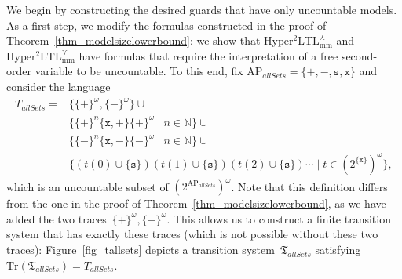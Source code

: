 \documentclass[dvipsnames,10pt,a4paper]{amsart}
\theoremstyle{definition}
\theoremstyle{remark}
\newcommand{\nats}{\mathbb{N}}
\newcommand{\pow}[1]{2^{#1}}
\newcommand{\set}[1]{\{#1\}}
\newcommand{\sohyltlfpmax}{\mathrm{Hyper^2LTL_{\mathrm{mm}}^{\largest}}\xspace}
\newcommand{\sohyltlfpmin}{\mathrm{Hyper^2LTL_{\mathrm{mm}}^{\smallest}}\xspace}
\newcommand{\ap}[0]{\mathrm{AP}}
\newcommand{\smallest}{\curlyvee}
\newcommand{\largest}{\curlywedge}
\newcommand{\tsys}{\mathfrak{T}}
\newcommand{\traces}{\mathrm{Tr}}
\newcommand{\posprop}{\mathtt{+}}
\newcommand{\negprop}{\mathtt{-}}
\newcommand{\setprop}{\mathtt{s}}
\newcommand{\inprop}{\mathtt{x}}
\newcommand{\allsets}{{\mathit{allSets}}}
\begin{document}
We begin by constructing the desired guards that have only uncountable models.
As a first step, we modify the formulas constructed in the proof of Theorem~\ref{thm_modelsizelowerbound}: we show that $\sohyltlfpmax$ and $\sohyltlfpmin$ have formulas that require the interpretation of a free second-order variable to be uncountable.
To this end, fix $\ap_\allsets = \set{\posprop, \negprop, \setprop,\inprop}$ and consider the language
\begin{align*}
T_\allsets ={}&{} \set{ \set{\posprop}^\omega,\set{\negprop}^\omega} \cup\\
&{}\set{\set{\posprop}^n \set{\inprop,\posprop} \set{\posprop}^\omega \mid n\in\nats} \cup\\
&{}\set{\set{\negprop}^n \set{\inprop,\negprop} \set{\negprop}^\omega \mid n\in\nats}{} \cup\\
&{}\set{ (t(0) \cup \set{\setprop})(t(1) \cup \set{\setprop})(t(2) \cup \set{\setprop}) \cdots \mid t \in (\pow{\set{\inprop}})^\omega},
\end{align*}
which is an uncountable subset of $(\pow{\ap_\allsets})^\omega$.
Note that this definition differs from the one in the proof of Theorem~\ref{thm_modelsizelowerbound}, as we have added the two traces~$\set{\posprop}^\omega,\set{\negprop}^\omega$.
This allows us to construct a finite transition system that has exactly these traces (which is not possible without these two traces): Figure~\ref{fig_tallsets} depicts a transition system~$\tsys_\allsets$ satisfying $\traces(\tsys_\allsets) = T_\allsets$.
\end{document}
